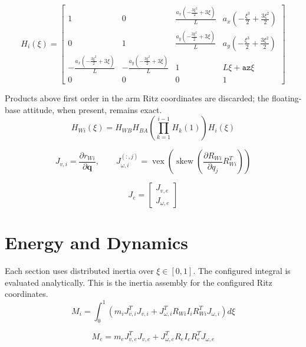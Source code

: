 \documentclass[11pt]{article}
\begin{document}
\begin{equation}
H_i(\xi)=\begin{bmatrix}1 & 0 & \frac{a_x \left(- \frac{3 \xi^{2}}{2} + 3 \xi\right)}{L} & a_x \left(- \frac{\xi^{3}}{2} + \frac{3 \xi^{2}}{2}\right)\\0 & 1 & \frac{a_y \left(- \frac{3 \xi^{2}}{2} + 3 \xi\right)}{L} & a_y \left(- \frac{\xi^{3}}{2} + \frac{3 \xi^{2}}{2}\right)\\- \frac{a_x \left(- \frac{3 \xi^{2}}{2} + 3 \xi\right)}{L} & - \frac{a_y \left(- \frac{3 \xi^{2}}{2} + 3 \xi\right)}{L} & 1 & L \xi + \mathtt{az} \xi\\0 & 0 & 0 & 1\end{bmatrix}\label{eq:local-transform}
\end{equation}

Products above first order in the arm Ritz coordinates are discarded; the floating-base attitude, when present, remains exact.
\begin{equation}
H_{Wi}(\xi)=H_{WB}H_{BA}\left(\prod_{k=1}^{i-1}H_k(1)\right)H_i(\xi)
\end{equation}

\begin{equation}
J_{v,i}=\frac{\partial r_{Wi}}{\partial\boldsymbol q},\qquad J_{\omega,i}^{(:,j)}=\operatorname{vex}\!\left(\operatorname{skew}\!\left(\frac{\partial R_{Wi}}{\partial q_j}R_{Wi}^{T}\right)\right)
\end{equation}

\begin{equation}
J_e=\begin{bmatrix}J_{v,e}\\J_{\omega,e}\end{bmatrix}
\end{equation}


\section{Energy and Dynamics}
Each section uses distributed inertia over $\xi\in[0,1]$. The configured integral is evaluated analytically. This is the inertia assembly for the configured Ritz coordinates.
\begin{equation}
M_i=\int_0^1\!\left(m_iJ_{v,i}^{T}J_{v,i}+J_{\omega,i}^{T}R_{Wi}I_iR_{Wi}^{T}J_{\omega,i}\right)d\xi
\end{equation}

\begin{equation}
M_e=m_eJ_{v,e}^{T}J_{v,e}+J_{\omega,e}^{T}R_eI_eR_e^TJ_{\omega,e}
\end{equation}
\end{document}
